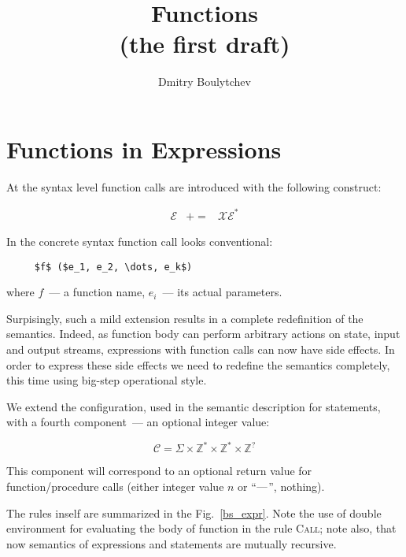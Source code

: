 \documentclass{article}
\title{Functions\\
  (the first draft)
}
\author{Dmitry Boulytchev}
\def\transarrow{\xrightarrow}
\newcommand{\setarrow}[1]{\def\transarrow{#1}}
\def\subarrow{}
\newcommand{\setsubarrow}[1]{\def\subarrow{#1}}
\newcommand{\rulename}[1]{\textsc{#1}}
\theoremstyle{definition}
\begin{document}
\maketitle

\section{Functions in Expressions}

At the syntax level function calls are introduced with the following construct: 

\[
\begin{array}{rcl}
  \mathscr E & += & \mathscr X \mathscr E^*
\end{array}
\]

In the concrete syntax function call looks conventional:

\begin{lstlisting}
     $f$ ($e_1, e_2, \dots, e_k$)
\end{lstlisting}

where $f$~--- a function name, $e_i$~--- its actual parameters.

Surpisingly, such a mild extension results in a complete redefinition of the semantics. Indeed, as function body can perform
arbitrary actions on state, input and output streams, expressions with function calls can now have side effects. In order to express these
side effects we need to redefine the semantics completely, this time using big-step operational style.

We extend the configuration, used in the semantic description for statements, with a fourth component~--- an optional integer value:

\[
\mathscr C = \Sigma \times \mathbb Z^* \times \mathbb Z^* \times \mathbb Z^?
\]

This component will correspond to an optional return value for function/procedure calls (either integer value $n$ or ``$\hbox{---}$'', nothing).

The rules inself are summarized in the Fig.~\ref{bs_expr}. Note the use of double environment for evaluating the body of function in the rule
\rulename{Call}; note also, that now semantics of expressions and statements are mutually recursive.

\setarrow{\xRightarrow}
\setsubarrow{_{\mathscr E}}
\end{document}
